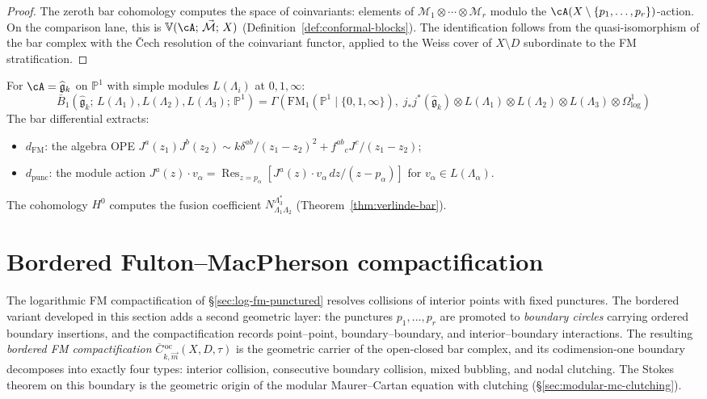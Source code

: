 \begin{proof}
The zeroth bar cohomology computes the space of coinvariants:
elements of $\mathcal{M}_1 \otimes \cdots \otimes \mathcal{M}_r$
modulo the $\cA(X \setminus \{p_1, \ldots, p_r\})$-action.
On the comparison lane, this is
$\mathbb{V}(\cA;\, \vec{\mathcal{M}};\, X)$
\textup{(}Definition~\ref{def:conformal-blocks}\textup{)}.
The identification follows from the quasi-isomorphism
of the bar complex with the Čech resolution of the
coinvariant functor, applied to the Weiss cover
of $X \setminus D$ subordinate to the FM stratification.
\end{proof}

\begin{example}\label{ex:log-fm-km}
For $\cA = \widehat{\mathfrak{g}}_k$ on $\mathbb{P}^1$ with
simple modules $L(\Lambda_i)$ at $0, 1, \infty$:
\[
\bar{B}_1(\widehat{\mathfrak{g}}_k;\,
L(\Lambda_1), L(\Lambda_2), L(\Lambda_3);\, \mathbb{P}^1)
= \Gamma(\mathrm{FM}_1(\mathbb{P}^1 \mathbin{|} \{0,1,\infty\}),\;
j_*j^*(\widehat{\mathfrak{g}}_k)
\otimes L(\Lambda_1)\otimes L(\Lambda_2)\otimes L(\Lambda_3)
\otimes \Omega^1_{\log})
\]
The bar differential extracts:
\begin{itemize}
\item $d_{\mathrm{FM}}$: the algebra OPE
 $J^a(z_1) J^b(z_2) \sim k\delta^{ab}/(z_1 - z_2)^2
 + f^{ab}{}_c J^c/(z_1 - z_2)$;
\item $d_{\mathrm{punc}}$: the module action
 $J^a(z) \cdot v_\alpha
 = \operatorname{Res}_{z=p_\alpha}
 [J^a(z) \cdot v_\alpha \, dz/(z - p_\alpha)]$
 for $v_\alpha \in L(\Lambda_\alpha)$.
\end{itemize}
The cohomology $H^0$ computes the fusion coefficient
$N_{\Lambda_1 \Lambda_2}^{\Lambda_3^*}$
\textup{(}Theorem~\textup{\ref{thm:verlinde-bar})}.
\end{example}

\section{Bordered Fulton--MacPherson compactification}
\label{sec:bordered-fm}

The logarithmic FM compactification of \S\ref{sec:log-fm-punctured}
resolves collisions of interior points with fixed punctures. The
bordered variant developed in this section adds a second geometric
layer: the punctures $p_1, \ldots, p_r$ are promoted to
\emph{boundary circles} carrying ordered boundary insertions, and
the compactification records point--point, boundary--boundary, and
interior--boundary interactions.
The resulting \emph{bordered FM compactification}
$\overline{C}{}^{\,\mathrm{oc}}_{k,\vec{m}}(X, D, \tau)$ is the
geometric carrier of the open-closed bar complex, and its
codimension-one boundary decomposes into exactly four types: interior
collision, consecutive boundary collision, mixed bubbling, and nodal
clutching. The Stokes theorem on this boundary is the geometric
origin of the modular Maurer--Cartan equation with clutching
(\S\ref{sec:modular-mc-clutching}).

